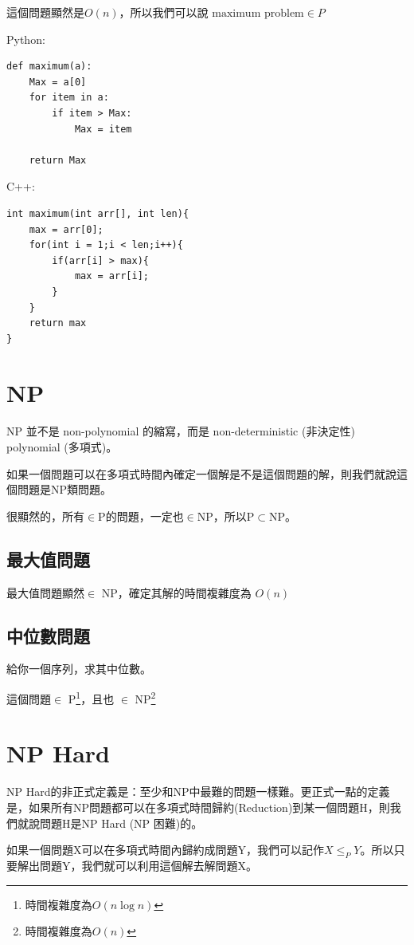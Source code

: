 \documentclass{article}
\begin{document}
這個問題顯然是$O(n)$，所以我們可以說 $\mbox{maximum problem} \in P$

Python:
\begin{verbatim}
def maximum(a):
    Max = a[0]
    for item in a:
        if item > Max:
            Max = item
            
    return Max
\end{verbatim}

C++:
\begin{verbatim}
int maximum(int arr[], int len){
    max = arr[0];
    for(int i = 1;i < len;i++){
        if(arr[i] > max){
            max = arr[i];
        }
    }    
    return max
}

\end{verbatim}


\section{NP}

NP 並不是 non-polynomial 的縮寫，而是 non-deterministic (非決定性) polynomial (多項式)。

如果一個問題可以在多項式時間內確定一個解是不是這個問題的解，則我們就說這個問題是NP類問題。

很顯然的，所有$\in$P的問題，一定也$\in$NP，所以P$\subset$NP。

\subsection{最大值問題}
最大值問題顯然$\in$ NP，確定其解的時間複雜度為 $O(n)$

\subsection{中位數問題}
給你一個序列，求其中位數。

這個問題$\in$ P\footnote{時間複雜度為$O(n \log n)$}，且也 $\in$ NP\footnote{時間複雜度為$O(n)$}

\section{NP Hard}
NP Hard的非正式定義是：至少和NP中最難的問題一樣難。更正式一點的定義是，如果所有NP問題都可以在多項式時間歸約(Reduction)到某一個問題H，則我們就說問題H是NP Hard (NP 困難)的。

如果一個問題X可以在多項式時間內歸約成問題Y，我們可以記作$X\leq _{P}Y$。所以只要解出問題Y，我們就可以利用這個解去解問題X。
\end{document}
